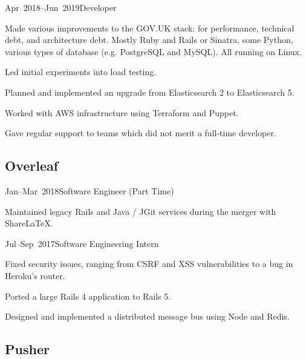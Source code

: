 \documentclass[a4paper]{barrucadu-cv}
\newcommand{\range}[2]{#1–#2}
\begin{document}
\begin{cventry}{\range{Apr~2018}{Jun~2019}}{Developer}
  \begin{tightitemize}
  \item Made various improvements to the GOV.UK stack: for performance, technical debt, and architecture debt.  Mostly Ruby and Rails or Sinatra, some Python, various types of database (e.g. PostgreSQL and MySQL).  All running on Linux.
  \item Led initial experiments into load testing.
  \item Planned and implemented an upgrade from Elasticsearch 2 to Elasticsearch 5.
  \item Worked with AWS infrastructure using Terraform and Puppet.
  \item Gave regular support to teams which did not merit a full-time developer.
  \end{tightitemize}
\end{cventry}

\subsection{Overleaf}

\begin{cventry}{\range{Jan}{Mar}~2018}{Software Engineer (Part Time)}
  \begin{tightitemize}
  \item Maintained legacy Rails and Java / JGit services during the merger with ShareLaTeX.
  \end{tightitemize}
\end{cventry}

\begin{cventry}{\range{Jul}{Sep}~2017}{Software Engineering Intern}
  \begin{tightitemize}
  \item Fixed security issues, ranging from CSRF and XSS vulnerabilities to a bug in Heroku's router.
  \item Ported a large Rails 4 application to Rails 5.
  \item Designed and implemented a distributed message bus using Node and Redis.
  \end{tightitemize}
\end{cventry}

\subsection{Pusher}
\end{document}
